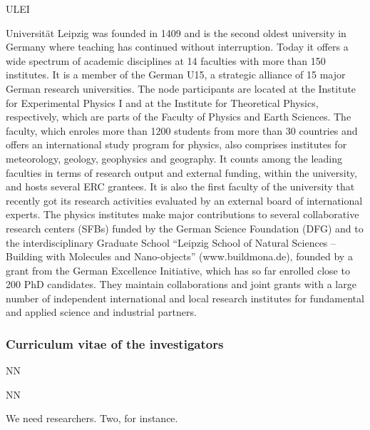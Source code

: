 \begin{sitedescription}{ULEI} \label{desc:ULEI}

 Universität Leipzig was founded in 1409 and is the second oldest university in Germany where teaching has continued without interruption. 
  Today it offers a wide spectrum of academic disciplines at 14 faculties with more than 150 institutes. 
  It is a member of the German U15, a strategic alliance of 15 major German research universities. 
  The node participants are located at the Institute for Experimental Physics I and at the Institute for Theoretical Physics, respectively, which are parts of the Faculty of Physics and Earth Sciences. 
  The faculty, which enroles more than 1200 students from more than 30 countries and offers an international study program for physics, also comprises institutes for meteorology, geology, geophysics and geography. 
  It counts among the leading faculties in terms of research output and external funding, within the university, and hosts several ERC grantees. 
  It is also the first faculty of the university that recently got its research activities evaluated by an external board of international experts. 
  The physics institutes make major contributions to several collaborative research centers (SFBs) funded by the German Science Foundation (DFG) and to the interdisciplinary Graduate School ``Leipzig School of Natural Sciences -- Building with Molecules and Nano-objects'' (www.buildmona.de), founded by a grant from the German Excellence Initiative, which has so far enrolled close to 200 PhD candidates. 
  They maintain collaborations and joint grants with a large number of independent international and local research institutes for fundamental and applied science and industrial partners. 

\subsubsection*{Curriculum vitae of the investigators}




\begin{participant}[type=res,PM=48,salary=5500]{NN}
\end{participant}
\begin{participant}[type=res,PM=36,salary=5500]{NN}

We need researchers. Two, for instance.

\end{participant}


\end{sitedescription}
